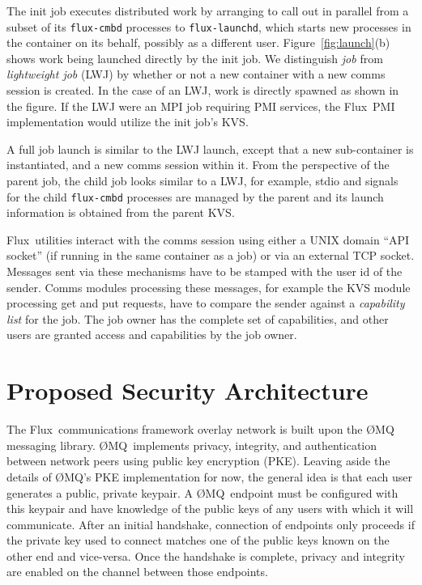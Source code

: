 \documentclass[10pt]{article}
\newcommand{\flux}{Flux}
\newcommand{\zMQ}{\O{}MQ}
\begin{document}
The init job executes distributed work
by arranging to call out in parallel from a subset of its
{\tt flux-cmbd} processes to {\tt flux-launchd}, which starts
new processes in the container on its behalf, possibly as a different user.
Figure~\ref{fig:launch}(b) shows work being launched directly by the
init job.  We distinguish {\em job} from {\em lightweight job} (LWJ)
by whether or not a new container with a new comms session is created.
In the case of an LWJ, work is directly spawned as shown in the figure.
If the LWJ were an MPI job requiring PMI services, the \flux\ PMI
implementation would utilize the init job's KVS.

A full job launch is similar to the LWJ launch, except that a new
sub-container is instantiated, and a new comms session within it.
From the perspective of the parent job, the child job looks similar to
a LWJ, for example, stdio and signals for the child {\tt flux-cmbd} processes
are managed by the parent and its launch information is obtained from
the parent KVS.

\flux\ utilities interact with the comms session using either a UNIX
domain ``API socket'' (if running in the same container as a job)
or via an external TCP socket.  Messages sent via these mechanisms
have to be stamped with the user id of the sender. Comms modules
processing these messages, for example the KVS module processing
get and put requests, have to compare the sender against a
{\em capability list} for the job.  The job owner has the complete
set of capabilities, and other users are granted access and capabilities
by the job owner.

\section{Proposed Security Architecture}
\label{sec:security}

The \flux\ communications framework overlay network
is built upon the \zMQ\cite{ZMQGuide} messaging library.
\zMQ\ implements privacy, integrity, and authentication
between network peers using public key encryption (PKE).
Leaving aside the details of \zMQ's PKE implementation for now,
the general idea is that each user generates a public, private keypair.
A \zMQ\ endpoint must be configured with this keypair and have knowledge
of the public keys of any users with which it will communicate.
After an initial handshake, connection of endpoints only proceeds
if the private key used to connect matches one of the public
keys known on the other end and vice-versa.  Once the handshake is
complete, privacy and integrity are enabled on the channel
between those endpoints.
\end{document}
